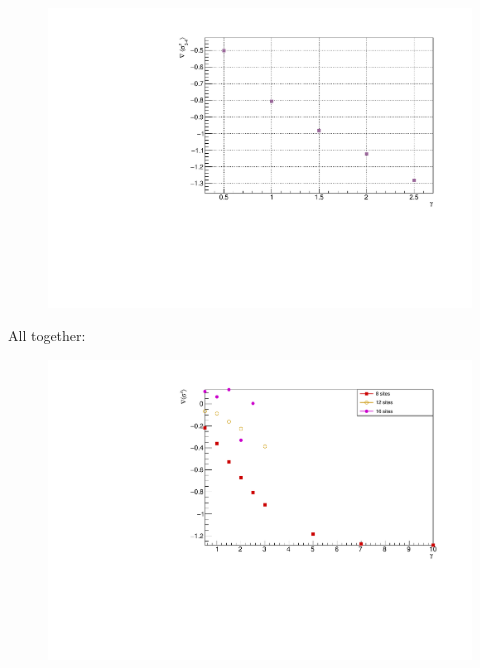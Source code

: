 \begin{figure}[H]
    \centering
    \includegraphics[scale=0.7]{Figures/16sites/16sites_gradLM_3and4VSgamma.pdf}
    \caption{}
    \label{fig:my_label}
\end{figure}

All together:

\begin{figure}[H]
    \centering
    \includegraphics[scale=0.7]{Figures/gradLMvsGammavsSize.pdf}
    \caption{}
    \label{fig:my_label}
\end{figure}


